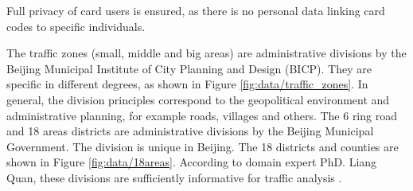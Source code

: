\documentclass{article}
\begin{document}
Full privacy of card users is ensured, as there is no personal data linking card codes to specific individuals. 

The traffic zones (small, middle and big areas) are administrative divisions by the Beijing Municipal Institute of City Planning and Design (BICP). They are specific in different degrees, as shown in Figure \ref{fig:data/traffic_zones}. In general, the division principles correspond to the geopolitical environment and administrative planning, for example roads, villages and others. The 6 ring road and 18 areas districts are administrative divisions by the Beijing Municipal Government. The division is unique in Beijing. The 18 districts and counties are shown in Figure \ref{fig:data/18areas}. According to domain expert PhD. Liang Quan, these divisions are sufficiently informative for traffic analysis \cite{liang}.
\end{document}
